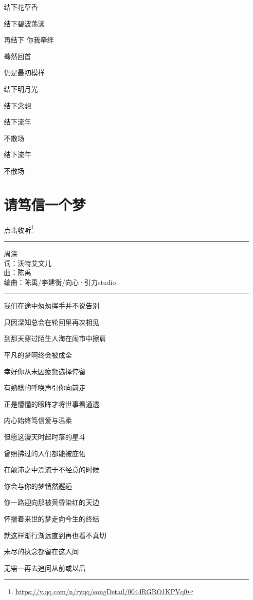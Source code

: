 \documentclass[]{ctexbook}
\renewcommand{\href}[2]{#2\footnote{\url{#1}}}
\begin{document}
结下花草香

结下碧波荡漾

再结下 你我牵绊

蓦然回首

仍是最初模样

结下明月光

结下念想

结下流年

不散场

结下流年

不散场

\section*{请笃信一个梦}\label{believe-your-dream}


\href{https://y.qq.com/n/ryqq/songDetail/0044RGRO1KPVq0}{点击收听}

\begin{center}\rule{0.5\linewidth}{0.5pt}\end{center}

周深\\
词：沃特艾文儿\\
曲：陈禹\\
编曲：陈禹/李建衡/向心·引力studio

\begin{center}\rule{0.5\linewidth}{0.5pt}\end{center}

我们在途中匆匆挥手并不说告别

只因深知总会在轮回里再次相见

到那天穿过陌生人海在闹市中擦肩

平凡的梦啊终会被成全

幸好你从未因疲惫选择停留

有熟稔的呼唤声引你向前走

正是懵懂的眼眸才将世事看通透

内心始终笃信爱与温柔

但愿这漫天时起时落的星斗

曾照拂过的人们都能被庇佑

在颠沛之中漂流于不经意的时候

你会与你的梦悄然邂逅

你一路迎向那被黄昏染红的天边

怀揣着来世的梦走向今生的终结

就这样渐行渐远直到再也看不真切

未尽的执念都留在这人间

无需一再去追问从前或以后
\end{document}
